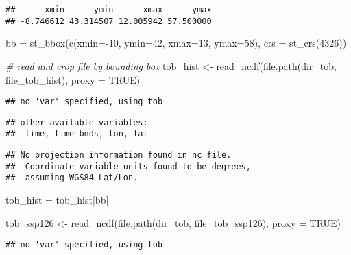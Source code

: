 \documentclass[
]{article}
\newenvironment{Shaded}{\begin{snugshade}}{\end{snugshade}}
\newcommand{\AttributeTok}[1]{\textcolor[rgb]{0.77,0.63,0.00}{#1}}
\newcommand{\CommentTok}[1]{\textcolor[rgb]{0.56,0.35,0.01}{\textit{#1}}}
\newcommand{\ConstantTok}[1]{\textcolor[rgb]{0.00,0.00,0.00}{#1}}
\newcommand{\DecValTok}[1]{\textcolor[rgb]{0.00,0.00,0.81}{#1}}
\newcommand{\FunctionTok}[1]{\textcolor[rgb]{0.00,0.00,0.00}{#1}}
\newcommand{\NormalTok}[1]{#1}
\newcommand{\OtherTok}[1]{\textcolor[rgb]{0.56,0.35,0.01}{#1}}
\newcommand{\SpecialCharTok}[1]{\textcolor[rgb]{0.00,0.00,0.00}{#1}}
\begin{document}
\begin{verbatim}
##      xmin      ymin      xmax      ymax 
## -8.746612 43.314507 12.005942 57.500000
\end{verbatim}

\begin{Shaded}
\begin{Highlighting}[]
\NormalTok{bb }\OtherTok{=} \FunctionTok{st\_bbox}\NormalTok{(}\FunctionTok{c}\NormalTok{(}\AttributeTok{xmin=}\SpecialCharTok{{-}}\DecValTok{10}\NormalTok{, }\AttributeTok{ymin=}\DecValTok{42}\NormalTok{, }
               \AttributeTok{xmax=}\DecValTok{13}\NormalTok{, }\AttributeTok{ymax=}\DecValTok{58}\NormalTok{),}
             \AttributeTok{crs =} \FunctionTok{st\_crs}\NormalTok{(}\DecValTok{4326}\NormalTok{))}

\CommentTok{\# read and crop file by bounding box}
\NormalTok{tob\_hist }\OtherTok{\textless{}{-}} \FunctionTok{read\_ncdf}\NormalTok{(}\FunctionTok{file.path}\NormalTok{(dir\_tob, file\_tob\_hist), }\AttributeTok{proxy =} \ConstantTok{TRUE}\NormalTok{)}
\end{Highlighting}
\end{Shaded}

\begin{verbatim}
## no 'var' specified, using tob
\end{verbatim}

\begin{verbatim}
## other available variables:
##  time, time_bnds, lon, lat
\end{verbatim}

\begin{verbatim}
## No projection information found in nc file. 
##  Coordinate variable units found to be degrees, 
##  assuming WGS84 Lat/Lon.
\end{verbatim}

\begin{Shaded}
\begin{Highlighting}[]
\NormalTok{tob\_hist }\OtherTok{=}\NormalTok{ tob\_hist[bb]}

\NormalTok{tob\_ssp126 }\OtherTok{\textless{}{-}} \FunctionTok{read\_ncdf}\NormalTok{(}\FunctionTok{file.path}\NormalTok{(dir\_tob, file\_tob\_ssp126), }\AttributeTok{proxy =} \ConstantTok{TRUE}\NormalTok{)}
\end{Highlighting}
\end{Shaded}

\begin{verbatim}
## no 'var' specified, using tob
\end{verbatim}
\end{document}
